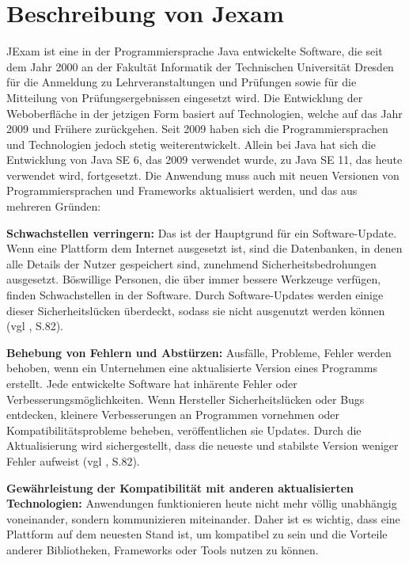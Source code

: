 \section{Beschreibung von Jexam}

JExam ist eine in der Programmiersprache Java entwickelte Software,
die seit dem Jahr 2000 an der Fakult\"at Informatik der Technischen
Universit\"at Dresden für die Anmeldung zu Lehrveranstaltungen und
Pr\"ufungen sowie für die Mitteilung von Pr\"ufungsergebnissen eingesetzt
wird. Die Entwicklung der Weboberfläche in der jetzigen Form basiert
auf Technologien, welche auf das Jahr 2009 und Frühere zur\"uckgehen.
Seit 2009 haben sich die Programmiersprachen und Technologien jedoch
stetig weiterentwickelt. Allein bei Java hat sich die Entwicklung von
Java SE 6, das 2009 verwendet wurde, zu Java SE 11, das heute verwendet
wird, fortgesetzt. Die Anwendung muss auch mit neuen Versionen von
Programmiersprachen und Frameworks aktualisiert werden, und das aus
mehreren Gründen:


\textbf{Schwachstellen verringern:} Das ist der Hauptgrund für ein
Software-Update. Wenn eine Plattform dem Internet ausgesetzt ist,
sind die Datenbanken, in denen alle Details der Nutzer gespeichert
sind, zunehmend Sicherheitsbedrohungen ausgesetzt. Böswillige
Personen, die über immer bessere Werkzeuge verfügen, finden
Schwachstellen in der Software.  Durch Software-Updates werden einige
dieser Sicherheitslücken überdeckt, sodass sie nicht ausgenutzt werden
können (vgl \cite{10.1145/605466.605479}, S.82).

\textbf{Behebung von Fehlern und Abstürzen:} Ausfälle, Probleme, Fehler
werden behoben, wenn ein Unternehmen eine aktualisierte Version eines
Programms erstellt. Jede entwickelte Software hat inhärente Fehler
oder Verbesserungsmöglichkeiten. Wenn Hersteller Sicherheitslücken
oder Bugs entdecken, kleinere Verbesserungen an Programmen vornehmen
oder Kompatibilitätsprobleme beheben, veröffentlichen sie Updates.
Durch die Aktualisierung wird sichergestellt, dass die neueste und
stabilste Version weniger Fehler aufweist (vgl \cite{10.1145/605466.605479}, S.82).

\textbf{Gewährleistung der Kompatibilität mit anderen aktualisierten
Technologien:} Anwendungen funktionieren heute nicht mehr völlig unabhängig
voneinander, sondern kommunizieren miteinander. Daher ist es wichtig, dass eine
Plattform auf dem neuesten Stand ist, um kompatibel zu sein und die
Vorteile anderer Bibliotheken, Frameworks oder Tools nutzen zu können.


